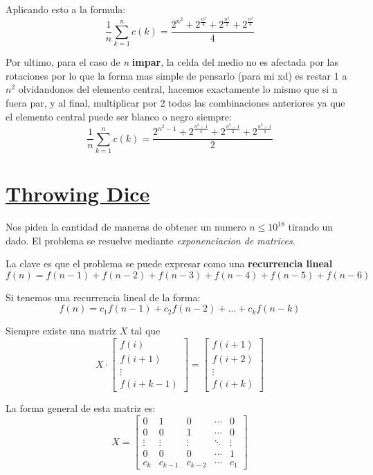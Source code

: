 \documentclass{article}
\begin{document}
Aplicando esto a la formula:
\[\frac{1}{n}\sum_{k=1}^{n}c(k) = \frac{2^{n^2} + 2^{\frac{n^2}{4}} + 2^{\frac{n^2}{2}} + 2^{\frac{n^2}{4}}}{4}\]

Por ultimo, para el caso de \textit{n} \textbf{impar}, la celda del medio no es afectada por las rotaciones por lo que la forma mas simple de pensarlo (para mi xd) es restar 1 a $n^2$ olvidandonos del elemento central, hacemos exactamente lo mismo que si n fuera par, y al final, multiplicar por 2 todas las combinaciones anteriores ya que el elemento central puede ser blanco o negro siempre:
\[\frac{1}{n}\sum_{k=1}^{n}c(k) = \frac{2^{n^2 - 1} + 2^{\frac{n^2 - 1}{4}} + 2^{\frac{n^2 - 1}{2}} + 2^{\frac{n^2 - 1}{4}}}{2}\]

\section{\href{https://cses.fi/problemset/task/1096}{Throwing Dice}}
Nos piden la cantidad de maneras de obtener un numero $n \leq 10^{18}$ tirando un dado. El problema se resuelve mediante \textit{exponenciacion de matrices}.

La clave es que el problema se puede expresar como una \textbf{recurrencia lineal}
\[f(n) = f(n - 1) + f(n - 2) + f(n - 3) + f(n - 4) + f(n - 5) + f(n - 6)\]

Si tenemos una recurrencia lineal de la forma:
\[f(n) = c_1f(n - 1) + c_2f(n - 2)+ \dots +c_kf(n - k)\]

Siempre existe una matriz $X$ tal que 
\[X \cdot \begin{bmatrix} f(i) \\ f(i+1) \\ \vdots \\ f(i+k-1) \end{bmatrix} = \begin{bmatrix} f(i+1) \\ f(i+2) \\ \vdots \\ f(i+k) \end{bmatrix}\]

La forma general de esta matriz es:
\[X = \begin{bmatrix} 
0 & 1 & 0 & \cdots & 0 \\ 
0 & 0 & 1 & \cdots & 0 \\ 
\vdots & \vdots & \vdots & \ddots & \vdots \\ 
0 & 0 & 0 & \cdots & 1 \\ 
c_k & c_{k-1} & c_{k-2} & \cdots & c_1 
\end{bmatrix}\]
\end{document}
